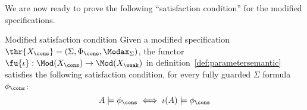 

We are now ready to prove the following ``satisfaction condition'' for the modified specifications.

\begin{proposition}{Modified satisfaction condition}
\label{pr:modsat}
Given a modified specification
	$\thr{X_\cons}=(\Sigma,\Phi_\cons,\Modax_{\Sigma})$, the functor
	$\fu{\iota}: \Mod(X_\cons) \to \Mod(X_{\weak})$ in
	definition~\ref{def:parametersemantic} satisfies the following
	satisfaction condition, for every fully guarded $\Sigma$ formula $\phi_\cons$: \[ A
	\models \phi_\cons \iff \iota(A) \models \phi_\cons \]
\end{proposition}


